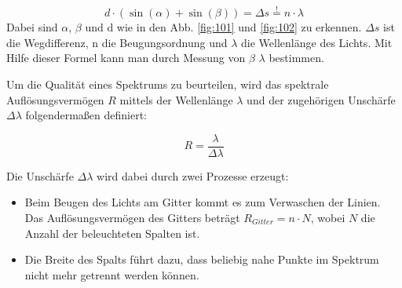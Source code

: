 \begin{equation}
d \cdot ( \sin(\alpha) + \sin(\beta) ) = \Delta s \overset{!}{=} n \cdot \lambda
\label{form:Interferenz}
\end{equation}
Dabei sind $\alpha$, $\beta$ und d wie in den Abb. \ref{fig:101} und \ref{fig:102} zu erkennen. $\Delta s$ ist  die Wegdifferenz, n die Beugungsordnung und $\lambda$ die Wellenlänge des Lichts. Mit Hilfe dieser Formel kann man durch Messung von $\beta$ $\lambda$ bestimmen.

Um die Qualität  eines Spektrums zu beurteilen, wird das spektrale Auflösungsvermögen $R$ mittels der Wellenlänge $\lambda$ und der zugehörigen Unschärfe $\Delta \lambda$ folgendermaßen definiert:

\begin{equation}
R = \frac{\lambda}{\Delta \lambda}
\end{equation}

\newpage

Die Unschärfe $\Delta \lambda$  wird  dabei durch zwei Prozesse erzeugt:

\begin{itemize}

\item Beim Beugen des Lichts am Gitter kommt es zum Verwaschen der Linien. Das Auflösungsvermögen des Gitters beträgt $ R_{Gitter} = n \cdot N $, wobei $ N $ die Anzahl der beleuchteten Spalten ist.

\item Die Breite des Spalts führt dazu, dass beliebig nahe Punkte im Spektrum nicht mehr getrennt werden können. 

\end{itemize}

